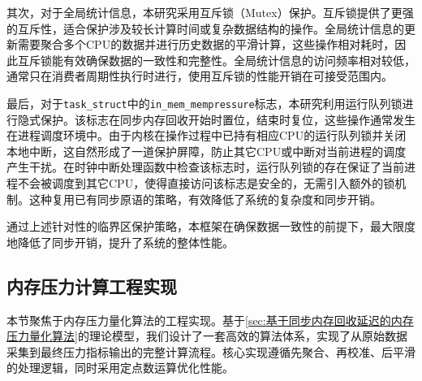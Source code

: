 其次，对于全局统计信息，本研究采用互斥锁（Mutex）保护。互斥锁提供了更强的互斥性，适合保护涉及较长计算时间或复杂数据结构的操作。全局统计信息的更新需要聚合多个CPU的数据并进行历史数据的平滑计算，这些操作相对耗时，因此互斥锁能有效确保数据的一致性和完整性。全局统计信息的访问频率相对较低，通常只在消费者周期性执行时进行，使用互斥锁的性能开销在可接受范围内。

最后，对于\texttt{task\_struct}中的\texttt{in\_mem\_mempressure}标志，本研究利用运行队列锁进行隐式保护。该标志在同步内存回收开始时置位，结束时复位，这些操作通常发生在进程调度环境中。由于内核在操作过程中已持有相应CPU的运行队列锁并关闭本地中断，这自然形成了一道保护屏障，防止其它CPU或中断对当前进程的调度产生干扰。在时钟中断处理函数中检查该标志时，运行队列锁的存在保证了当前进程不会被调度到其它CPU，使得直接访问该标志是安全的，无需引入额外的锁机制。这种复用已有同步原语的策略，有效降低了系统的复杂度和同步开销。

通过上述针对性的临界区保护策略，本框架在确保数据一致性的前提下，最大限度地降低了同步开销，提升了系统的整体性能。



\subsection{内存压力计算工程实现}
\label{sec:内存压力计算算法}

本节聚焦于内存压力量化算法的工程实现。基于\ref{sec:基于同步内存回收延迟的内存压力量化算法}的理论模型，我们设计了一套高效的算法体系，实现了从原始数据采集到最终压力指标输出的完整计算流程。核心实现遵循先聚合、再校准、后平滑的处理逻辑，同时采用定点数运算优化性能。


